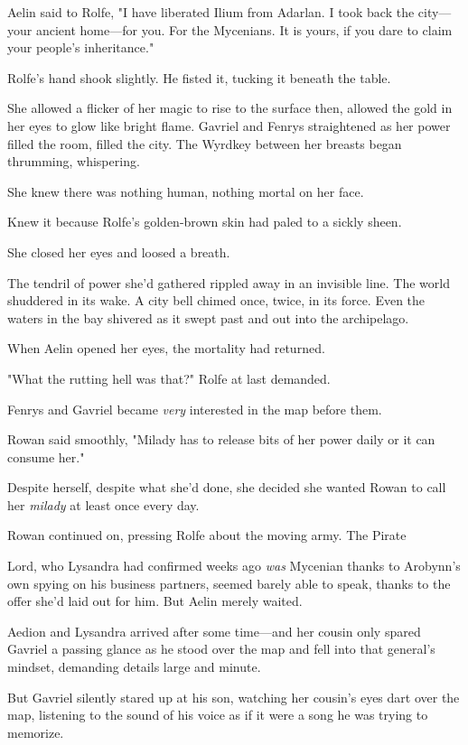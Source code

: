 Aelin said to Rolfe, "I have liberated Ilium from Adarlan. I took back the city---your ancient home---for you. For the Mycenians. It is yours, if you dare to claim your people's inheritance."

Rolfe's hand shook slightly. He fisted it, tucking it beneath the table.

She allowed a flicker of her magic to rise to the surface then, allowed the gold in her eyes to glow like bright flame. Gavriel and Fenrys straightened as her power filled the room, filled the city. The Wyrdkey between her breasts began thrumming, whispering.

She knew there was nothing human, nothing mortal on her face.

Knew it because Rolfe's golden-brown skin had paled to a sickly sheen.

She closed her eyes and loosed a breath.

The tendril of power she'd gathered rippled away in an invisible line. The world shuddered in its wake. A city bell chimed once, twice, in its force. Even the waters in the bay shivered as it swept past and out into the archipelago.

When Aelin opened her eyes, the mortality had returned.

"What the rutting hell was that?" Rolfe at last demanded.

Fenrys and Gavriel became \emph{very} interested in the map before them.

Rowan said smoothly, "Milady has to release bits of her power daily or it can consume her."

Despite herself, despite what she'd done, she decided she wanted Rowan to call her \emph{milady} at least once every day.

Rowan continued on, pressing Rolfe about the moving army. The Pirate

Lord, who Lysandra had confirmed weeks ago \emph{was} Mycenian thanks to Arobynn's own spying on his business partners, seemed barely able to speak, thanks to the offer she'd laid out for him. But Aelin merely waited.

Aedion and Lysandra arrived after some time---and her cousin only spared Gavriel a passing glance as he stood over the map and fell into that general's mindset, demanding details large and minute.

But Gavriel silently stared up at his son, watching her cousin's eyes dart over the map, listening to the sound of his voice as if it were a song he was trying to memorize.

